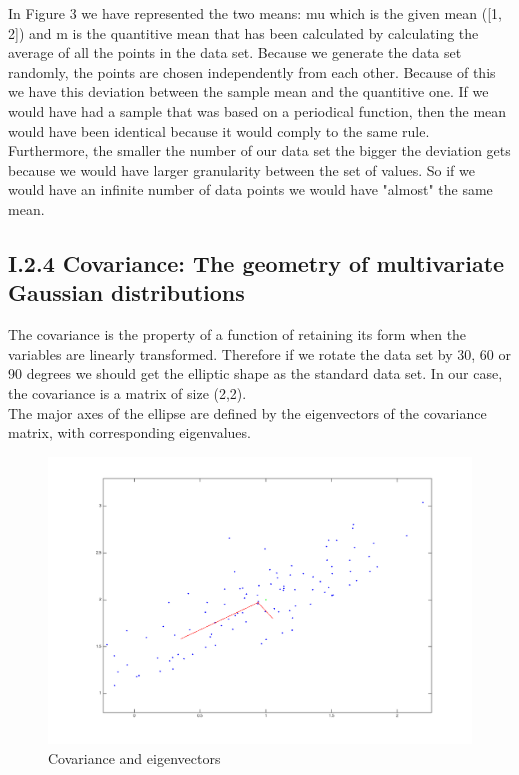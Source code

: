 \documentclass{article}      %
\begin{document}
In Figure 3 we have represented the two means: mu which is the given mean ([1, 2]) and m is the quantitive mean that has been calculated by calculating the average of all the points in the data set. Because we generate the data set randomly, the points are chosen independently from each other. Because of this we have this deviation between the sample mean and the quantitive one. If we would have had a sample that was based on a periodical function, then the mean would have been identical because it would comply to the same rule. Furthermore, the smaller the number of our data set the bigger the deviation gets because we would have larger granularity between the set of values. So if we would have an infinite number of data points we would have "almost" the same mean.\\

\subsection*{I.2.4 Covariance: The geometry of multivariate Gaussian distributions}
The covariance is the property of a function of retaining its form when the variables are linearly transformed. Therefore if we rotate the data set by 30, 60 or 90 degrees we should get the elliptic shape as the standard data set. In our case, the covariance is a matrix of size (2,2).\\
The major axes of the ellipse are defined by the eigenvectors of the covariance matrix, with corresponding eigenvalues.\\

\begin{figure}[h]
\centering
\includegraphics[scale=.3]{img/i24}
\caption{Covariance and eigenvectors \label{overflow}}
\end{figure}
\end{document}

